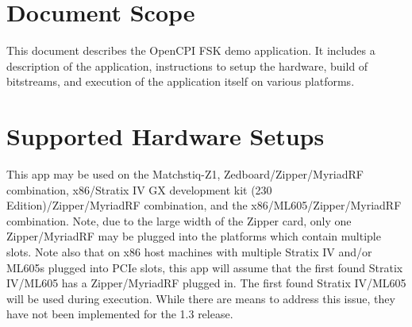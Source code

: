 \newpage
\tableofcontents
\pagebreak
\section{Document Scope}
This document describes the OpenCPI FSK demo application. It includes a description of the application, instructions to setup the hardware, build of bitstreams, and execution of the application itself on various platforms.

\section{Supported Hardware Setups}
This app may be used on the Matchstiq-Z1, Zedboard/Zipper/MyriadRF combination, x86/Stratix IV GX development kit (230 Edition)/Zipper/MyriadRF combination, and the x86/ML605/Zipper/MyriadRF combination. Note, due to the large width of the Zipper card, only one Zipper/MyriadRF may be plugged into the platforms which contain multiple slots. Note also that on x86 host machines with multiple Stratix IV and/or ML605s plugged into PCIe slots, this app will assume that the first found Stratix IV/ML605 has a Zipper/MyriadRF plugged in. The first found Stratix IV/ML605 will be used during execution. While there are means to address this issue, they have not been implemented for the 1.3 release.

